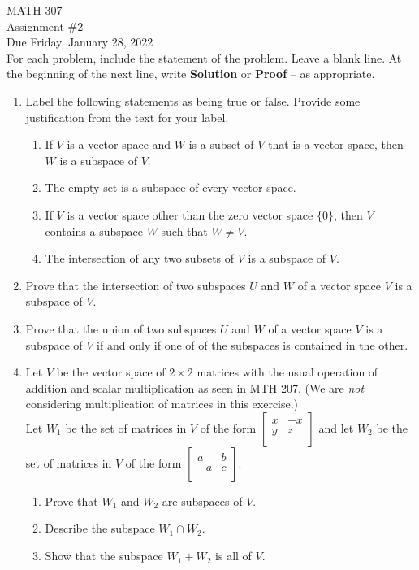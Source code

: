 \documentclass[12pt]{article}
\begin{document}
\noindent MATH 307 \\
Assignment \#2 \\  %
Due Friday, January 28, 2022 \\

For each problem, include the statement of the problem. Leave a blank line.  At the beginning of the next line, write \textbf{Solution} or \textbf{Proof} -- as appropriate.

\begin{enumerate}
\item Label the following statements as being true or false.
Provide some justification from the text for your label.
    \begin{enumerate}
        \item  If $V$ is a vector space and $W$ is a subset of $V$ that is a vector space, then $W$ is a subspace of $V$.
        \item The empty set is a subspace of every vector space.
        \item If $V$ is a vector space other than the zero vector space $\{0\}$, then $V$ contains a subspace $W$ such that $W \ne V$.
        \item The intersection of any two subsets of $V$ is a subspace of $V$.
    \end{enumerate}

\item  Prove that the intersection of two subspaces $U$ and $W$ of a vector space $V$ is a subspace of $V$.

\item  Prove that the union of two subspaces  $U$ and $W$ of a vector space $V$ is a subspace of $V$ if and only if one of of the subspaces is contained in the other.

\item Let $V$ be the vector space of $2 \times 2$ matrices with the usual operation of addition and scalar multiplication as seen in MTH 207.  (We are \emph{not} considering multiplication of matrices in this exercise.)\\
    Let $W_1$ be the set of matrices in $V$ of the form
    $\left[
      \begin{array}{cc}
        x & -x \\
        y & z \\
      \end{array}
    \right]$ and let $W_2$ be the set of matrices in $V$ of the form
    $\left[
      \begin{array}{cc}
        a & b \\
        -a & c \\
      \end{array}
      \right]$.
      \begin{enumerate}
      \item Prove that $W_1$ and $W_2$ are subspaces of $V$.
      \item Describe the subspace $W_1 \cap W_2$.
      \item Show that the subspace $W_1 + W_2$ is all of $V$.
      \end{enumerate}


\end{enumerate}
\end{document}
